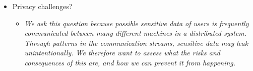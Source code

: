 \begin{itemize}
\begin{itemize}
\begin{itemize}
\begin{itemize}
			\end{itemize}
			\item Privacy challenges?
			\begin{itemize}
				\item \textit{We ask this question because possible sensitive data of users is frequently communicated between many different machines in a distributed system. Through patterns in the communication streams, sensitive data may leak unintentionally. We therefore want to assess what the risks and consequences of this are, and how we can prevent it from happening.}
			\end{itemize}
		\end{itemize}
	\end{itemize}
\end{itemize}